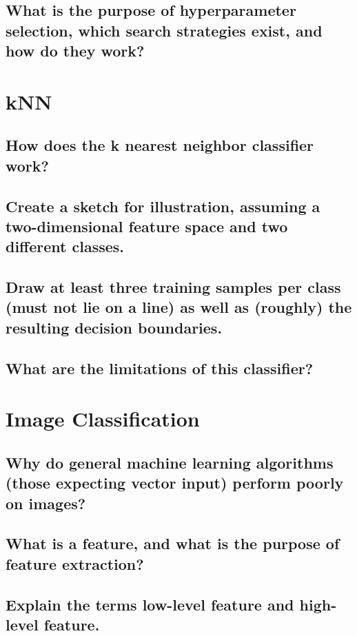 \subsection{What is the purpose of hyperparameter selection, which search strategies exist, and how do they work?}

\section{kNN}

\subsection{How does the k nearest neighbor classifier work?}

\subsection{Create a sketch for illustration, assuming a two-dimensional feature space and two different classes.}

\subsection{Draw at least three training samples per class (must not lie on a line) as well as (roughly) the resulting decision boundaries.}

\subsection{What are the limitations of this classifier?}

\section{Image Classification}

\subsection{Why do general machine learning algorithms (those expecting vector input) perform poorly on images?}

\subsection{What is a feature, and what is the purpose of feature extraction?}

\subsection{Explain the terms low-level feature and high-level feature.}

